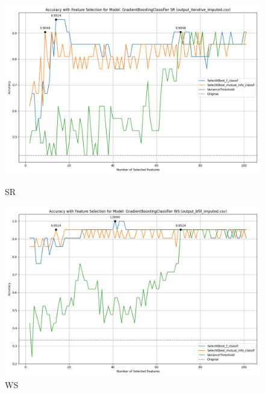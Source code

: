 \begin{figure}[H]
    \centering
    \begin{minipage}[b]{0.45\textwidth}
        \includegraphics[width=\textwidth]{class_all_section/images/feature_selection_accuracy_plot_output_iterative_imputedcsv_GradientBoostingClassifier_SR.png}
        \caption{SR}
        \label{fig:sr_class}
    \end{minipage}
    \hfill
    \begin{minipage}[b]{0.45\textwidth}
        \includegraphics[width=\textwidth]{class_all_section/images/feature_selection_accuracy_plot_output_bfill_imputedcsv_GradientBoostingClassifier_WS.png}
        \caption{WS}
        \label{fig:ws_class}
    \end{minipage}
\end{figure}

